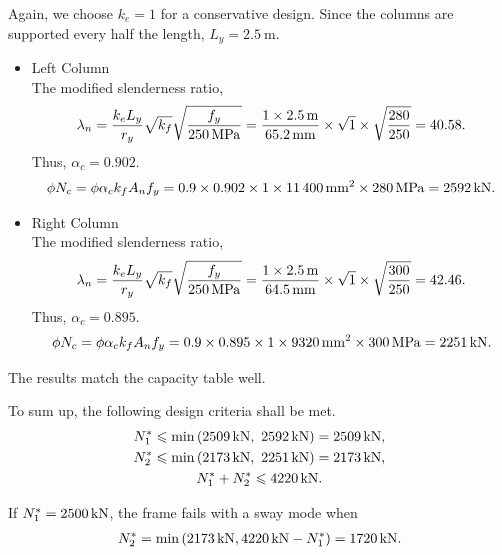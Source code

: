 \begin{solution}
\begin{itemize}
Again, we choose $k_e=1$ for a conservative design.
Since the columns are supported every half the length, $L_y=\SI{2.5}{\meter}$.
\begin{itemize}
\item Left Column\\
The modified slenderness ratio,
\begin{gather*}
\lambda_n=\dfrac{k_eL_y}{r_y}\sqrt{k_f}\sqrt{\dfrac{f_y}{\SI{250}{\mega\pascal}}}=\dfrac{1\times\SI{2.5}{\meter}}{\SI{65.2}{\milli\meter}}\times\sqrt{1}\times\sqrt{\dfrac{280}{250}}=40.58.
\end{gather*}
Thus, $\alpha_c=0.902$.
\begin{gather*}
\phi{}N_c=\phi\alpha_ck_fA_nf_y=0.9\times0.902\times1\times\SI{11400}{\milli\meter^2}\times\SI{280}{\mega\pascal}=\SI{2592}{\kilo\newton}.
\end{gather*}
\item Right Column\\
The modified slenderness ratio,
\begin{gather*}
\lambda_n=\dfrac{k_eL_y}{r_y}\sqrt{k_f}\sqrt{\dfrac{f_y}{\SI{250}{\mega\pascal}}}=\dfrac{1\times\SI{2.5}{\meter}}{\SI{64.5}{\milli\meter}}\times\sqrt{1}\times\sqrt{\dfrac{300}{250}}=42.46.
\end{gather*}
Thus, $\alpha_c=0.895$.
\begin{gather*}
\phi{}N_c=\phi\alpha_ck_fA_nf_y=0.9\times0.895\times1\times\SI{9320}{\milli\meter^2}\times\SI{300}{\mega\pascal}=\SI{2251}{\kilo\newton}.
\end{gather*}
\end{itemize}
The results match the capacity table well.
\end{itemize}
To sum up, the following design criteria shall be met.
\begin{gather*}
N^*_1\leqslant\min\left(\SI{2509}{\kilo\newton},~\SI{2592}{\kilo\newton}\right)=\SI{2509}{\kilo\newton},\\
N^*_2\leqslant\min\left(\SI{2173}{\kilo\newton},~\SI{2251}{\kilo\newton}\right)=\SI{2173}{\kilo\newton},\\
N^*_1+N^*_2\leqslant\SI{4220}{\kilo\newton}.
\end{gather*}

If $N^*_1=\SI{2500}{\kilo\newton}$, the frame fails with a sway mode when
\begin{gather*}
N^*_2=\min\left(\SI{2173}{\kilo\newton},\SI{4220}{\kilo\newton}-N^*_1\right)=\SI{1720}{\kilo\newton}.
\end{gather*}
\end{solution}

